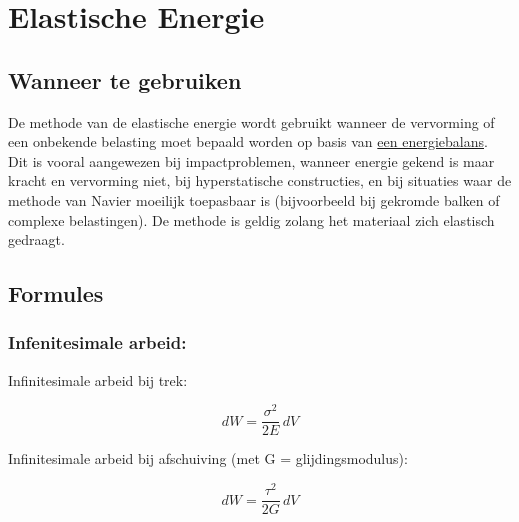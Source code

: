 \documentclass[a4paper,11pt]{article}
\begin{document}
\section{Elastische Energie}

\subsection*{Wanneer te gebruiken}

De methode van de elastische energie wordt gebruikt wanneer de vervorming of een onbekende belasting moet bepaald worden op basis van \underline{een energiebalans}. Dit is vooral aangewezen bij impactproblemen, wanneer energie gekend is maar kracht en vervorming niet, bij hyperstatische constructies, en bij situaties waar de methode van Navier moeilijk toepasbaar is (bijvoorbeeld bij gekromde balken of complexe belastingen). De methode is geldig zolang het materiaal zich elastisch gedraagt.

\subsection*{Formules}
\vspace{.2cm}
\subsubsection*{Infenitesimale arbeid:}
\vspace{.2cm}
\noindent
\begin{minipage}[t]{0.42\textwidth}
\noindent Infinitesimale arbeid bij trek:

\vspace{0.8em}

\begin{equation}
dW = \frac{\sigma^2}{2E} \, dV
\end{equation}
\end{minipage}
\hfill
\begin{minipage}[t]{0.45\textwidth}
\noindent Infinitesimale arbeid bij afschuiving (met G = glijdingsmodulus):

\vspace{0.8em}

\begin{equation}
dW = \frac{\tau^2}{2G} \, dV
\end{equation}
\end{minipage}

\vspace{-.5cm}
\end{document}
